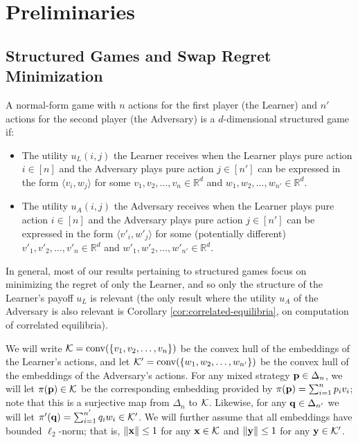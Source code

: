 \documentclass[final,12pt]{alt2025}
\begin{document}
\section{Preliminaries}

\subsection{Structured Games and Swap Regret Minimization}

A normal-form game with $n$ actions for the first player (the Learner) and $n'$ actions for the second player (the Adversary) is a $d$-dimensional structured game if:

\begin{itemize}
    \item The utility $u_L(i, j)$ the Learner receives when the Learner plays pure action $i \in [n]$ and the Adversary plays pure action $j \in [n']$ can be expressed in the form $\langle v_i, w_j \rangle$ for some  $v_1, v_2, \dots, v_n \in \mathbb{R}^{d}$ and $w_1, w_2, \dots, w_{n'} \in \mathbb{R}^{d}$.

    \item The utility $u_A(i, j)$ the Adversary receives when the Learner plays pure action $i \in [n]$ and the Adversary plays pure action $j \in [n']$ can be expressed in the form $\langle v'_i, w'_j \rangle$ for some (potentially different) $v'_1, v'_2, \dots, v'_n \in \mathbb{R}^{d}$ and $w'_1, w'_2, \dots, w'_{n'} \in \mathbb{R}^{d}$.
\end{itemize}

In general, most of our results pertaining to structured games focus on minimizing the regret of only the Learner, and so only the structure of the Learner's payoff $u_L$ is relevant (the only result where the utility $u_A$ of the Adversary is also relevant is Corollary \ref{cor:correlated-equilibria}, on computation of correlated equilibria). 

We will write $\mathcal{K} = \mathrm{conv}(\{v_1, v_2, \dots, v_n\})$ be the convex hull of the embeddings of the Learner's actions, and let $\mathcal{K}' = \mathrm{conv}(\{w_1, w_2, \dots, w_{n'}\})$ be the convex hull of the embeddings of the Adversary's actions. For any mixed strategy $\mathbf{p} \in \Delta_{n}$, we will let $\pi(\mathbf{p}) \in \mathcal{K}$ be the corresponding embedding provided by $\pi(\mathbf{p}) = \sum_{i=1}^{n} p_iv_i$; note that this is a surjective map from $\Delta_{n}$ to $\mathcal{K}$. Likewise, for any $\mathbf{q} \in \Delta_{n'}$ we will let $\pi'(\mathbf{q}) = \sum_{i=1}^{n'}q_iw_i \in \mathcal{K}'$. We will further assume that all embeddings have bounded $\ell_2$-norm; that is, $\left\|\mathbf{x}\right\| \leq 1$ for any $\mathbf{x} \in \mathcal{K}$ and $\left\|\mathbf{y}\right\| \leq 1$ for any $\mathbf{y} \in \mathcal{K}'$.
\end{document}
